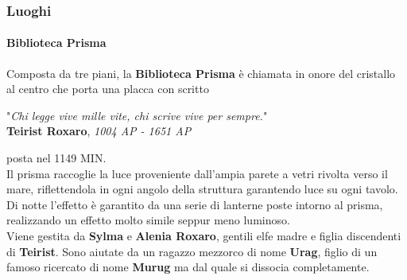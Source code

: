 \documentclass[10pt,twoside,onecolumn,openany]{book}
\begin{document}
\subsubsection{Luoghi}
\paragraph{Biblioteca Prisma}
Composta da tre piani, la \textbf{Biblioteca Prisma} è chiamata in onore del cristallo al centro che porta una placca con scritto \begin{center}
"\textit{Chi legge vive mille vite, chi scrive vive per sempre.}"\\
\textbf{Teirist Roxaro}, \textit{1004 AP - 1651 AP}
\end{center}
posta nel 1149 MIN.\\
Il prisma raccoglie la luce proveniente dall'ampia parete a vetri rivolta verso il mare, riflettendola in ogni angolo della struttura garantendo luce su ogni tavolo. Di notte l'effetto è garantito da una serie di lanterne poste intorno al prisma, realizzando un effetto molto simile seppur meno luminoso.\\
Viene gestita da \textbf{Sylma} e \textbf{Alenia Roxaro}, gentili elfe madre e figlia discendenti di \textbf{Teirist}. Sono aiutate da un ragazzo mezzorco di nome \textbf{Urag}, figlio di un famoso ricercato di nome \textbf{Murug} ma dal quale si dissocia completamente.
\end{document}
